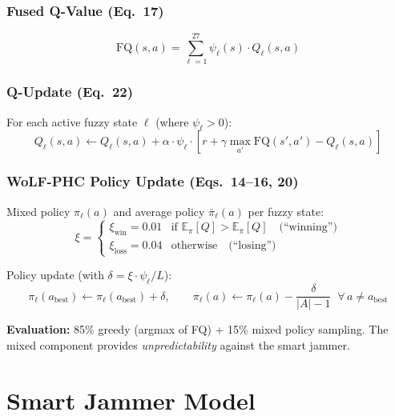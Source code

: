 \documentclass[11pt,a4paper]{article}
\begin{document}
\subsubsection{Fused Q-Value (Eq.~17)}

\begin{equation}
\mathrm{FQ}(s, a) = \sum_{\ell=1}^{27} \psi_\ell(s) \cdot Q_\ell(s, a)
\end{equation}

\subsubsection{Q-Update (Eq.~22)}

For each active fuzzy state $\ell$ (where $\psi_\ell > 0$):
\begin{equation}
Q_\ell(s, a) \leftarrow Q_\ell(s, a) + \alpha \cdot \psi_\ell \cdot \left[r + \gamma \max_{a'} \mathrm{FQ}(s', a') - Q_\ell(s, a)\right]
\end{equation}

\subsubsection{WoLF-PHC Policy Update (Eqs.~14--16, 20)}

Mixed policy $\pi_\ell(a)$ and average policy $\bar{\pi}_\ell(a)$ per fuzzy state:
\begin{equation}
\xi = \begin{cases}
    \xi_{\mathrm{win}} = 0.01 & \text{if } \mathbb{E}_{\pi}[Q] > \mathbb{E}_{\bar{\pi}}[Q] \quad \text{(``winning'')} \\
    \xi_{\mathrm{loss}} = 0.04 & \text{otherwise} \quad \text{(``losing'')}
\end{cases}
\end{equation}

Policy update (with $\delta = \xi \cdot \psi_\ell / L$):
\begin{equation}
\pi_\ell(a_{\mathrm{best}}) \leftarrow \pi_\ell(a_{\mathrm{best}}) + \delta, \qquad
\pi_\ell(a) \leftarrow \pi_\ell(a) - \frac{\delta}{|A|-1} \;\;\forall\, a \neq a_{\mathrm{best}}
\end{equation}

\textbf{Evaluation:} 85\% greedy (argmax of FQ) + 15\% mixed policy sampling. The mixed component provides \emph{unpredictability} against the smart jammer.


\section{Smart Jammer Model}
\end{document}
